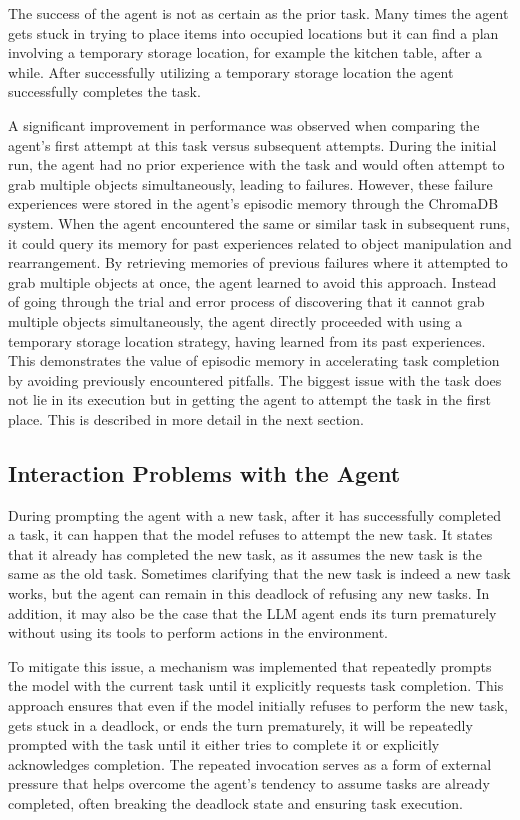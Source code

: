 \documentclass[../report.tex]{subfiles}
\begin{document}
The success of the agent is not as certain as the prior task. Many times the agent gets stuck in trying to place items into occupied locations but it can find a plan involving a temporary storage location, for example the kitchen table, after a while. After successfully utilizing a temporary storage location the agent successfully completes the task.

A significant improvement in performance was observed when comparing the agent's first attempt at this task versus subsequent attempts. During the initial run, the agent had no prior experience with the task and would often attempt to grab multiple objects simultaneously, leading to failures. However, these failure experiences were stored in the agent's episodic memory through the ChromaDB system. When the agent encountered the same or similar task in subsequent runs, it could query its memory for past experiences related to object manipulation and rearrangement. By retrieving memories of previous failures where it attempted to grab multiple objects at once, the agent learned to avoid this approach. Instead of going through the trial and error process of discovering that it cannot grab multiple objects simultaneously, the agent directly proceeded with using a temporary storage location strategy, having learned from its past experiences. This demonstrates the value of episodic memory in accelerating task completion by avoiding previously encountered pitfalls. The biggest issue with the task does not lie in its execution but in getting the agent to attempt the task in the first place. This is described in more detail in the next section.

\subsection{Interaction Problems with the Agent}
During prompting the agent with a new task, after it has successfully completed a task, it can happen that the model refuses to attempt the new task. It states that it already has completed the new task, as it assumes the new task is the same as the old task. Sometimes clarifying that the new task is indeed a new task works, but the agent can remain in this deadlock of refusing any new tasks. In addition, it may also be the case that the LLM agent ends its turn prematurely without using its tools to perform actions in the environment.

To mitigate this issue, a mechanism was implemented that repeatedly prompts the model with the current task until it explicitly requests task completion. This approach ensures that even if the model initially refuses to perform the new task, gets stuck in a deadlock, or ends the turn prematurely, it will be repeatedly prompted with the task until it either tries to complete it or explicitly acknowledges completion. The repeated invocation serves as a form of external pressure that helps overcome the agent's tendency to assume tasks are already completed, often breaking the deadlock state and ensuring task execution.
\end{document}
